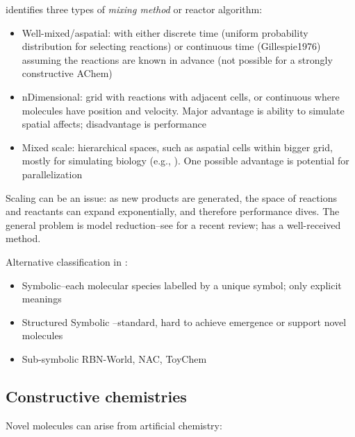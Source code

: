 \autocite{Faulconbridge2011} identifies three types of
\emph{mixing method} or reactor algorithm:

\begin{itemize}
	\item
 Well-mixed/aspatial: with either discrete time (uniform probability
 distribution for selecting reactions) or continuous time
 (Gillespie1976) assuming the reactions are known in advance (not
 possible for a strongly constructive AChem)
	\item
 nDimensional: grid with reactions with adjacent cells, or continuous
 where molecules have position and velocity. Major advantage is ability
 to simulate spatial affects; disadvantage is performance
	\item
 Mixed scale: hierarchical spaces, such as aspatial cells within bigger
 grid, mostly for simulating biology (e.g., \autocite{Jeschke2008}). One possible
 advantage is potential for parallelization
\end{itemize}

Scaling can be an issue: as new products are generated, the space of
reactions and reactants can expand exponentially, and therefore
performance dives. The general problem is model reduction--see
\autocite{Radulescu2012} for a recent review; \autocite{Faulon2001} has
a well-received method.

Alternative classification in \autocite{Faulconbridge2011}:

\begin{itemize}
	\item
 Symbolic--each molecular species labelled by a unique symbol; only
 explicit meanings
	\item
 Structured Symbolic \eg \autocite{Hutton2002}--standard, hard to achieve
 emergence or support novel molecules
	\item
 Sub-symbolic \eg RBN-World, NAC, ToyChem \autocite{Benko2005}
\end{itemize}

\subsection{Constructive chemistries}\label{constructive-chemistries}

Novel molecules can arise from artificial chemistry:

{\autocite{Benko2009}}


